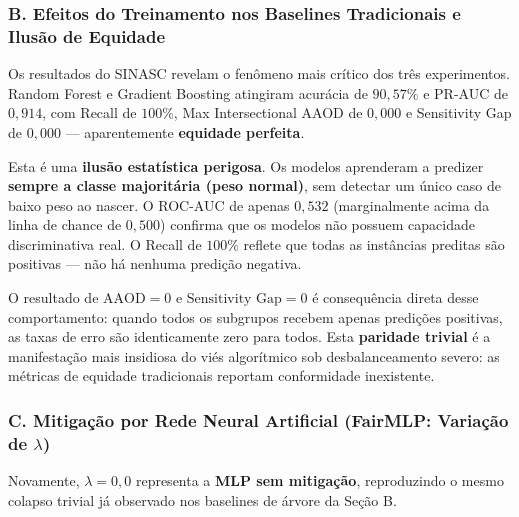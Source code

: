 \subsubsection{B. Efeitos do Treinamento nos Baselines Tradicionais e Ilusão de Equidade}

Os resultados do SINASC revelam o fenômeno mais crítico dos três experimentos. Random Forest e Gradient Boosting atingiram acurácia de $90,57\%$ e PR-AUC de $0,914$, com Recall de $100\%$, Max Intersectional AAOD de $0,000$ e Sensitivity Gap de $0,000$ --- aparentemente \textbf{equidade perfeita}.

Esta é uma \textbf{ilusão estatística perigosa}. Os modelos aprenderam a predizer \textbf{sempre a classe majoritária (peso normal)}, sem detectar um único caso de baixo peso ao nascer. O ROC-AUC de apenas $0,532$ (marginalmente acima da linha de chance de $0,500$) confirma que os modelos não possuem capacidade discriminativa real. O Recall de $100\%$ reflete que todas as instâncias preditas são positivas --- não há nenhuma predição negativa.

O resultado de $\text{AAOD}=0$ e $\text{Sensitivity Gap}=0$ é consequência direta desse comportamento: quando todos os subgrupos recebem apenas predições positivas, as taxas de erro são identicamente zero para todos. Esta \textbf{paridade trivial} é a manifestação mais insidiosa do viés algorítmico sob desbalanceamento severo: as métricas de equidade tradicionais reportam conformidade inexistente.

\subsubsection{C. Mitigação por Rede Neural Artificial (FairMLP: Variação de $\lambda$)}

Novamente, $\lambda = 0,0$ representa a \textbf{MLP sem mitigação}, reproduzindo o mesmo colapso trivial já observado nos baselines de árvore da Seção B.

